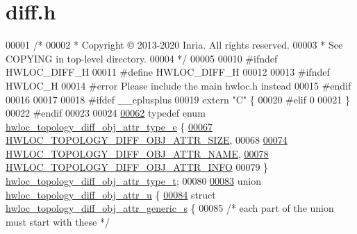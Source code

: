 \hypertarget{a00170_source}{}\section{diff.\+h}
\label{a00170_source}

\begin{DoxyCode}
00001 \textcolor{comment}{/*}
00002 \textcolor{comment}{ * Copyright © 2013-2020 Inria.  All rights reserved.}
00003 \textcolor{comment}{ * See COPYING in top-level directory.}
00004 \textcolor{comment}{ */}
00005 
00010 \textcolor{preprocessor}{#ifndef HWLOC\_DIFF\_H}
00011 \textcolor{preprocessor}{#define HWLOC\_DIFF\_H}
00012 
00013 \textcolor{preprocessor}{#ifndef HWLOC\_H}
00014 \textcolor{preprocessor}{#error Please include the main hwloc.h instead}
00015 \textcolor{preprocessor}{#endif}
00016 
00017 
00018 \textcolor{preprocessor}{#ifdef \_\_cplusplus}
00019 \textcolor{keyword}{extern} \textcolor{stringliteral}{"C"} \{
00020 \textcolor{preprocessor}{#elif 0}
00021 \}
00022 \textcolor{preprocessor}{#endif}
00023 
00024 
\hyperlink{a00225_ga86f044210b0a9e9fa83acbdbbf7e05fd}{00062} \textcolor{keyword}{typedef} \textcolor{keyword}{enum} \hyperlink{a00225_ga86f044210b0a9e9fa83acbdbbf7e05fd}{hwloc\_topology\_diff\_obj\_attr\_type\_e} \{
\hyperlink{a00225_gga86f044210b0a9e9fa83acbdbbf7e05fdabc7f0c7ed0b6864e902f4b70f2c7bc94}{00067}   \hyperlink{a00225_gga86f044210b0a9e9fa83acbdbbf7e05fdabc7f0c7ed0b6864e902f4b70f2c7bc94}{HWLOC\_TOPOLOGY\_DIFF\_OBJ\_ATTR\_SIZE},
00068 
\hyperlink{a00225_gga86f044210b0a9e9fa83acbdbbf7e05fda94a8f37c51d62d15ac6192665dd49310}{00074}   \hyperlink{a00225_gga86f044210b0a9e9fa83acbdbbf7e05fda94a8f37c51d62d15ac6192665dd49310}{HWLOC\_TOPOLOGY\_DIFF\_OBJ\_ATTR\_NAME},
\hyperlink{a00225_gga86f044210b0a9e9fa83acbdbbf7e05fda63430bf932434bc456282f636d39c2c2}{00078}   \hyperlink{a00225_gga86f044210b0a9e9fa83acbdbbf7e05fda63430bf932434bc456282f636d39c2c2}{HWLOC\_TOPOLOGY\_DIFF\_OBJ\_ATTR\_INFO}
00079 \} \hyperlink{a00225_ga5f2dd099de2cacdc0d0d4858154b971a}{hwloc\_topology\_diff\_obj\_attr\_type\_t};
00080 
\hyperlink{a00334}{00083} \textcolor{keyword}{union }\hyperlink{a00334}{hwloc\_topology\_diff\_obj\_attr\_u} \{
\hyperlink{a00338}{00084}   \textcolor{keyword}{struct }\hyperlink{a00338}{hwloc\_topology\_diff\_obj\_attr\_generic\_s} \{
00085     \textcolor{comment}{/* each part of the union must start with these */}

\end{DoxyCode}
